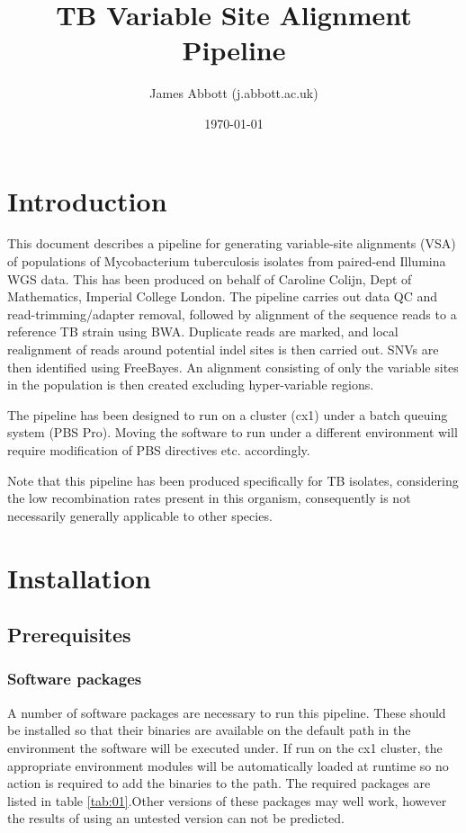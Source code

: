 \documentclass[a4paper,10pt,twoside]{article}
\title{TB Variable Site Alignment Pipeline}
\date{\today}
\author{James Abbott (j.abbott\@imperial.ac.uk)}
\begin{document}
\maketitle
\thispagestyle{fancy} %

\tableofcontents

\section{Introduction}

This document describes a pipeline for generating variable-site alignments
(VSA) of populations of Mycobacterium tuberculosis isolates from paired-end
Illumina WGS data. This has been produced on behalf of Caroline Colijn, Dept of
Mathematics, Imperial College London. The pipeline carries out data QC and
read-trimming/adapter removal, followed by alignment of the sequence reads to a
reference TB strain using BWA.  Duplicate reads are marked, and local
realignment of reads around potential indel sites is then carried out. SNVs are
then identified using FreeBayes. An alignment consisting of only the variable
sites in the population is then created excluding hyper-variable regions.

The pipeline has been designed to run on a cluster (cx1) under a batch queuing
system (PBS Pro). Moving the software to run under a different environment will
require modification of PBS directives etc. accordingly.

Note that this pipeline has been produced specifically for TB isolates,
considering the low recombination rates present in this organism, consequently
is not necessarily generally applicable to other species.

\section{Installation}


\subsection{Prerequisites}

\subsubsection{Software packages}

A number of software packages are necessary to run this pipeline. These should
be installed so that their binaries are available on the default path in the
environment the software will be executed under. If run on the cx1 cluster, the
appropriate environment modules will be automatically loaded at runtime so no
action is required to add the binaries to the path. The required packages are
listed in table \ref{tab:01}.Other versions of these packages may well work,
however the results of using an untested version can not be predicted.
\end{document}

